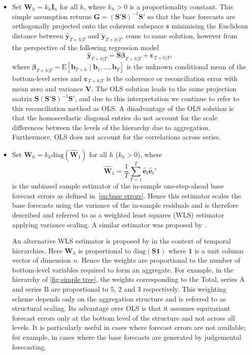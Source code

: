 \documentclass[a4paper, 11pt]{article}
\def\E{\text{E}}
\def\E{\text{E}}
\begin{document}
\begin{itemize}\parskip=1.2ex
	\item Set $\bm{W}_{h}=k_h\bm{I}_n$ for all $h$, where $k_{h} > 0$ is a proportionality constant. This simple assumption returns $\bm{G}=(\bm{S}'\bm{S})^{-1}\bm{S}'$ so that the base forecasts are orthogonally projected onto the coherent subspace $\mathfrak{s}$ minimising the Euclidean distance between $\hat{\bm{y}}_{T+h|T}$ and $\tilde{\bm{y}}_{T+h|T}$. \citet{HynEtAl2011} come to same solution, however from the perspective of the following regression model
	\begin{equation*}
	\hat{\bm{y}}_{T+h|T} = \bm{S}\bm{\beta}_{T+h|T} + \bm{\varepsilon}_{T+h|T},
	\end{equation*}
	where $\bm{\beta}_{T+h|T}=\E[\bm{b}_{T+h}\mid\bm{b}_1,\dots,\bm{b}_T]$ is the unknown conditional mean of the bottom-level series and $\bm{\varepsilon}_{T+h|T}$ is the coherence or reconciliation error with mean zero and variance $\bm{V}$. The OLS solution leads to the same projection matrix $\bm{S}(\bm{S}'\bm{S})^{-1}\bm{S}'$, and due to this interpretation we continue to refer to this reconciliation method as OLS\@. A disadvantage of the OLS solution is that the homoscedastic diagonal entries do not account for the scale differences between the levels of the hierarchy due to aggregation. Furthermore, OLS does not account for the correlations across series.

	\item Set ${\bm{W}}_{h}=k_{h}\text{diag}(\hat{\bm{W}}_{1})$ for all $h$ ($k_{h} > 0$), where
	$$
	\hat{\bm{W}}_{1} = \frac{1}{T}\sum_{T=1}^{T} \hat{\bm{e}}_{t}\hat{\bm{e}}_{t}'
	$$
	is the unbiased sample estimator of the in-sample one-step-ahead base forecast errors as defined in~\eqref{eq:base errors}. Hence this estimator scales the base forecasts using the variance of the in-sample residuals and is therefore described and referred to as a weighted least squares (WLS) estimator applying variance scaling. A similar estimator was proposed by \citet{Hyndman2016}.

	An alternative WLS estimator is proposed by \citet{AthEtAl2017} in the context of temporal hierarchies. Here $\bm{W}_{h}$ is proportional to $\text{diag}(\bm{S}\bm{1})$ where $\bm{1}$ is a unit column vector of dimension $n$. Hence the weights are proportional to the number of bottom-level variables required to form an aggregate. For example, in the hierarchy of \autoref{fig:simple tree}, the weights corresponding to the Total, series A and series B are proportional to 5, 2 and 3 respectively. This weighting scheme depends only on the aggregation structure and is referred to as structural scaling. Its advantage over OLS is that it assumes equivariant forecast errors only at the bottom level of the structure and not across all levels. It is particularly useful in cases where forecast errors are not available; for example, in cases where the base forecasts are generated by judgemental forecasting.


\end{itemize}
\end{document}
